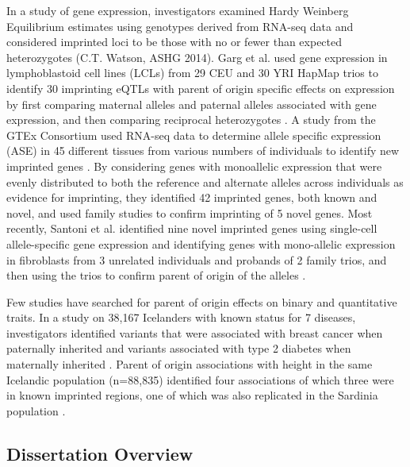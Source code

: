 In a study of gene expression, investigators examined Hardy Weinberg Equilibrium estimates using genotypes derived from RNA-seq data and considered imprinted loci to be those with no or fewer than expected heterozygotes (C.T. Watson, ASHG 2014). Garg et al. used gene expression in lymphoblastoid cell lines (LCLs) from 29 CEU and 30 YRI HapMap trios to identify 30 imprinting eQTLs with parent of origin specific effects on expression by first comparing maternal alleles and paternal alleles associated with gene expression, and then comparing reciprocal heterozygotes \cite{Garg2012a}. A study from the GTEx Consortium used RNA-seq data to determine allele specific expression (ASE) in 45 different tissues from various numbers of individuals to identify new imprinted genes \cite{Baran:2015cx}. By considering genes with monoallelic expression that were evenly distributed to both the reference and alternate alleles across individuals as evidence for imprinting, they identified 42 imprinted genes, both known and novel, and used family studies to confirm imprinting of 5 novel genes. Most recently, Santoni et al. identified nine novel imprinted genes using single-cell allele-specific gene expression and identifying genes with mono-allelic expression in fibroblasts from 3 unrelated individuals and probands of 2 family trios, and then using the trios to confirm parent of origin of the alleles \cite{Santoni:2017hu}.

Few studies have searched for parent of origin effects on binary and quantitative traits. In a study on 38,167 Icelanders with known status for 7 diseases, investigators identified variants that were associated with breast cancer when paternally inherited and variants associated with type 2 diabetes when maternally inherited \cite{Kong:2009kk}. Parent of origin associations with height in the same Icelandic population (n=88,835) identified four associations of which three were in known imprinted regions, one of which was also replicated in the Sardinia population \cite{Zoledziewska:2015do}.

\subsection{Dissertation Overview}

